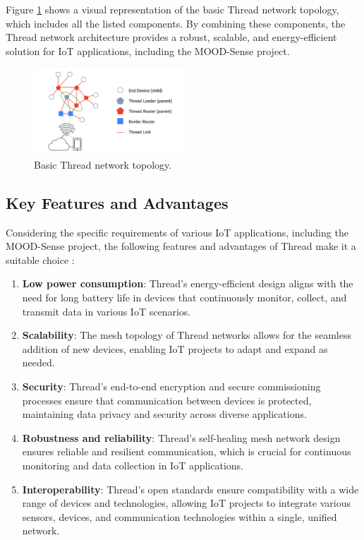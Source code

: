 Figure \ref{fig:thread_topology} shows a visual representation of the basic Thread network topology, which includes all the listed components. By combining these components, the Thread network architecture provides a robust, scalable, and energy-efficient solution for IoT applications, including the MOOD-Sense project.

\begin{figure}[H]
    \centering
    \includegraphics[width=0.5\textwidth]{images/situational_theoretical_analysis/thread_topology.png}
    \caption{Basic Thread network topology.}
    \label{fig:thread_topology}
\end{figure}


\subsection{Key Features and Advantages}

Considering the specific requirements of various IoT applications, including the MOOD-Sense project, the following features and advantages of Thread make it a suitable choice \cite{Thread_Group_Fundamentals}:

\begin{enumerate}
    \item \textbf{Low power consumption}: Thread's energy-efficient design aligns with the need for long battery life in devices that continuously monitor, collect, and transmit data in various IoT scenarios.
    \item \textbf{Scalability}: The mesh topology of Thread networks allows for the seamless addition of new devices, enabling IoT projects to adapt and expand as needed.
    \item \textbf{Security}: Thread's end-to-end encryption and secure commissioning processes ensure that communication between devices is protected, maintaining data privacy and security across diverse applications.
    \item \textbf{Robustness and reliability}: Thread's self-healing mesh network design ensures reliable and resilient communication, which is crucial for continuous monitoring and data collection in IoT applications.
    \item \textbf{Interoperability}: Thread's open standards ensure compatibility with a wide range of devices and technologies, allowing IoT projects to integrate various sensors, devices, and communication technologies within a single, unified network.
\end{enumerate}

